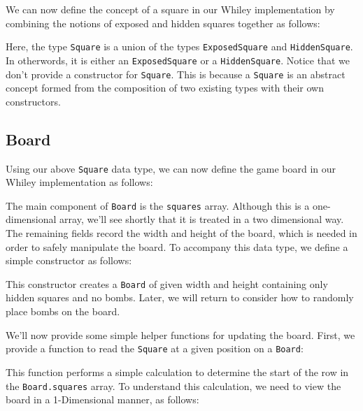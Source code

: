 

We can now define the concept of a square in our Whiley implementation by combining the notions of exposed and hidden squares together as follows:



Here, the type \lstinline{Square} is a union of the types \lstinline{ExposedSquare} and \lstinline{HiddenSquare}.  In otherwords, it is either an \lstinline{ExposedSquare} or a \lstinline{HiddenSquare}.  Notice that we don't provide a constructor for \lstinline{Square}.  This is because a \lstinline{Square} is an abstract concept formed from the composition of two existing types with their own constructors.

\subsection{Board}
\label{s_minesweeper_board}

Using our above \lstinline{Square} data type, we can now define the game board in our Whiley implementation as follows:



The main component of \lstinline{Board} is the \lstinline{squares} array.  Although this is a one-dimensional array, we'll see shortly that it is treated in a two dimensional way.  The remaining fields record the width and height of the board, which is needed in order to safely manipulate the board.  To accompany this data type, we define a simple constructor as follows:



This constructor creates a \lstinline{Board} of given width and height containing only hidden squares and no bombs.  Later, we will return to consider how to randomly place bombs on the board.

We'll now provide some simple helper functions for updating the board.  First, we provide a function to read the \lstinline{Square} at a given position on a \lstinline{Board}:



This function performs a simple calculation to determine the start of the row in the \lstinline{Board.squares} array.  To understand this calculation, we need to view the board in a 1-Dimensional manner, as follows:

